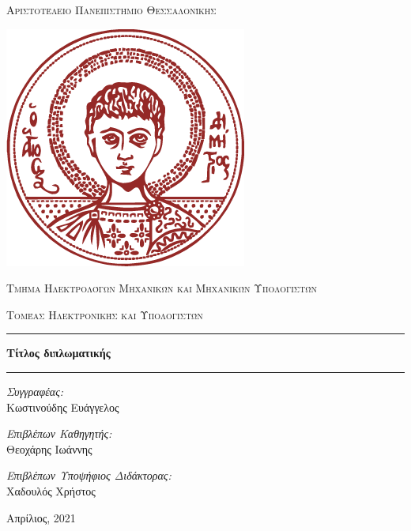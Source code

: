 \documentclass[a4paper,12pt]{article}
\newcommand{\HRule}{\rule{\linewidth}{0.5mm}}
\begin{document}
\begin{titlepage}

\center
 
\textsc{\LARGE Αριστοτέλειο Πανεπιστήμιο Θεσσαλονίκης}


\includegraphics[scale=.3]{LogoAUTH72ppi.png}

\textsc{\Large Τμήμα Ηλεκτρολόγων Μηχανικών και Μηχανικών Υπολογιστών}
\vspace{0.5cm}

\textsc{\large Τομέας Ηλεκτρονικής και Υπολογιστών}
\vspace{0.5cm}

\HRule
\vspace{0.4cm}
{ \huge \bfseries Τίτλος διπλωματικής}
\vspace{0.4cm}
\HRule
\vspace{1cm}

\begin{minipage}{0.8\textwidth}
    \center
    \large
    \emph{Συγγραφέας:} \\ 
    \Large
    Κωστινούδης Ευάγγελος
\end{minipage}
\vspace{0.5cm}

\begin{minipage}{0.8\textwidth}
    \center
    \large
    \emph{Επιβλέπων Καθηγητής:} \\ 
    \Large
    Θεοχάρης Ιωάννης \\
\end{minipage}
\vspace{0.5cm}

\begin{minipage}{0.8\textwidth}
    \center
    \large
    \emph{Επιβλέπων Υποψήφιος Διδάκτορας:} \\ 
    \Large
    Χαδουλός Χρήστος
\end{minipage}
\vspace{0.5cm}

\vspace*{\fill}

{\large Απρίλιος, 2021}

\end{titlepage}
\end{document}

